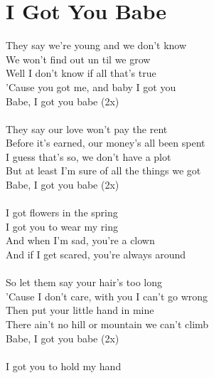 \section{I Got You Babe}
\color{red}\textcolor{black}{}They say we're young and \textcolor{black}{}we don't know\\
We \textcolor{black}{}won't find out un \textcolor{black}{}til\textcolor{black}{} we \textcolor{black}{}grow\\
\color{blue}
Well I don't know if all that's true\\
'Cause you got me, and baby I got you\\
\textcolor{black}{}Babe, \color{black}I got you babe (2x)\\
\\
\color{red}
They say our love won't pay the rent\\
Before it's earned, our money's all been spent\\
\color{blue}
I guess that's so, we don't have a plot\\
But at least I'm sure of all the things we got\\
Babe, \color{black}I got you babe (2x)\\
\\
\color{blue}
I got \textcolor{black}{}flowers in the \textcolor{black}{}spring\\
I got you to wear my ring\\
\color{red}
And when I'm \textcolor{black}{}sad, you're a \textcolor{black}{}clown\\
And if I get scared, you're always \textcolor{black}{}around\textcolor{black}{}\\
\\
So \textcolor{black}{}let them say your \textcolor{black}{}hair's too long\\
'Cause \textcolor{black}{}I don't care, with \textcolor{black}{}you I \textcolor{black}{}can't go \textcolor{black}{}wrong\\
\color{blue}
Then put your little hand in mine\\
There ain't no hill or mountain we can't climb\\
\textcolor{black}{}Babe, \color{black}I got you babe (2x)\\
\\
\color{blue} \textcolor{black}{}I got you to \textcolor{black}{}hold my hand\\
